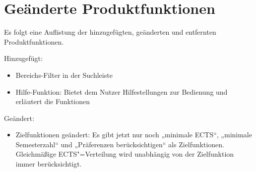 \FloatBarrier
\section{Geänderte Produktfunktionen}

Es folgt eine Auflistung der hinzugefügten, geänderten und entfernten Produktfunktionen.

Hinzugefügt:
\begin{itemize}
	\item Bereichs-Filter in der Suchleiste
	\item Hilfe-Funktion: Bietet dem Nutzer Hilfestellungen zur Bedienung und erläutert die Funktionen
\end{itemize}

Geändert: 
\begin{itemize}
	\item Zielfunktionen geändert: Es gibt jetzt nur noch „minimale ECTS“, „minimale Semesterzahl“ und „Präferenzen berücksichtigen“ als Zielfunktionen. Gleichmäßige ECTS"=Verteilung wird unabhängig von der Zielfunktion immer berücksichtigt.
\end{itemize}